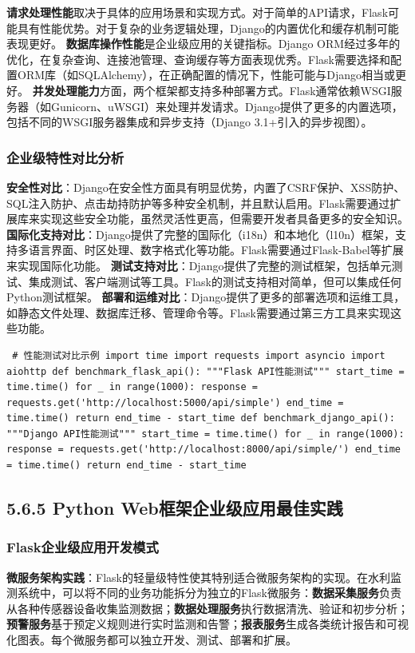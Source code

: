 \textbf{请求处理性能}取决于具体的应用场景和实现方式。对于简单的API请求，Flask可能具有性能优势。对于复杂的业务逻辑处理，Django的内置优化和缓存机制可能表现更好。 \textbf{数据库操作性能}是企业级应用的关键指标。Django ORM经过多年的优化，在复杂查询、连接池管理、查询缓存等方面表现优秀。Flask需要选择和配置ORM库（如SQLAlchemy），在正确配置的情况下，性能可能与Django相当或更好。 \textbf{并发处理能力}方面，两个框架都支持多种部署方式。Flask通常依赖WSGI服务器（如Gunicorn、uWSGI）来处理并发请求。Django提供了更多的内置选项，包括不同的WSGI服务器集成和异步支持（Django 3.1+引入的异步视图）。 \subsubsection{企业级特性对比分析}\label{ux4f01ux4e1aux7ea7ux7279ux6027ux5bf9ux6bd4ux5206ux6790} \textbf{安全性对比}：Django在安全性方面具有明显优势，内置了CSRF保护、XSS防护、SQL注入防护、点击劫持防护等多种安全机制，并且默认启用。Flask需要通过扩展库来实现这些安全功能，虽然灵活性更高，但需要开发者具备更多的安全知识。 \textbf{国际化支持对比}：Django提供了完整的国际化（i18n）和本地化（l10n）框架，支持多语言界面、时区处理、数字格式化等功能。Flask需要通过Flask-Babel等扩展来实现国际化功能。 \textbf{测试支持对比}：Django提供了完整的测试框架，包括单元测试、集成测试、客户端测试等工具。Flask的测试支持相对简单，但可以集成任何Python测试框架。 \textbf{部署和运维对比}：Django提供了更多的部署选项和运维工具，如静态文件处理、数据库迁移、管理命令等。Flask需要通过第三方工具来实现这些功能。 \begin{verbatim} # 性能测试对比示例 import time import requests import asyncio import aiohttp def benchmark_flask_api(): """Flask API性能测试""" start_time = time.time() for _ in range(1000): response = requests.get('http://localhost:5000/api/simple') end_time = time.time() return end_time - start_time def benchmark_django_api(): """Django API性能测试""" start_time = time.time() for _ in range(1000): response = requests.get('http://localhost:8000/api/simple/') end_time = time.time() return end_time - start_time \end{verbatim} \subsection{5.6.5 Python Web框架企业级应用最佳实践}\label{python-webux6846ux67b6ux4f01ux4e1aux7ea7ux5e94ux7528ux6700ux4f73ux5b9eux8df5} \subsubsection{Flask企业级应用开发模式}\label{flaskux4f01ux4e1aux7ea7ux5e94ux7528ux5f00ux53d1ux6a21ux5f0f} \textbf{微服务架构实践}：Flask的轻量级特性使其特别适合微服务架构的实现。在水利监测系统中，可以将不同的业务功能拆分为独立的Flask微服务：\textbf{数据采集服务}负责从各种传感器设备收集监测数据；\textbf{数据处理服务}执行数据清洗、验证和初步分析；\textbf{预警服务}基于预定义规则进行实时监测和告警；\textbf{报表服务}生成各类统计报告和可视化图表。每个微服务都可以独立开发、测试、部署和扩展。 